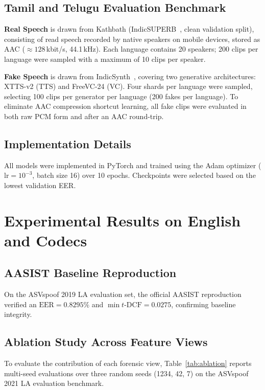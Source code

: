 \documentclass[conference]{IEEEtran}
\begin{document}
\subsection{Tamil and Telugu Evaluation Benchmark}
\textbf{Real Speech} is drawn from Kathbath (IndicSUPERB~\cite{javed2023indicsuperb}, clean validation split), consisting of read speech recorded by native speakers on mobile devices, stored as AAC ($\approx 128$\,kbit/s, 44.1\,kHz). Each language contains 20 speakers; 200 clips per language were sampled with a maximum of 10 clips per speaker.

\textbf{Fake Speech} is drawn from IndicSynth~\cite{sharma2025indicsynth}, covering two generative architectures: XTTS-v2 (TTS) and FreeVC-24 (VC). Four shards per language were sampled, selecting 100 clips per generator per language (200 fakes per language). To eliminate AAC compression shortcut learning, all fake clips were evaluated in both raw PCM form and after an AAC round-trip.

\subsection{Implementation Details}
All models were implemented in PyTorch and trained using the Adam optimizer ($\text{lr} = 10^{-3}$, batch size 16) over 10 epochs. Checkpoints were selected based on the lowest validation EER.

\section{Experimental Results on English and Codecs}

\subsection{AASIST Baseline Reproduction}
On the ASVspoof 2019 LA evaluation set, the official AASIST reproduction verified an $\text{EER} = 0.8295\%$ and $\min t\text{-DCF} = 0.0275$, confirming baseline integrity.

\subsection{Ablation Study Across Feature Views}
To evaluate the contribution of each forensic view, Table~\ref{tab:ablation} reports multi-seed evaluations over three random seeds (1234, 42, 7) on the ASVspoof 2021 LA evaluation benchmark.
\end{document}
